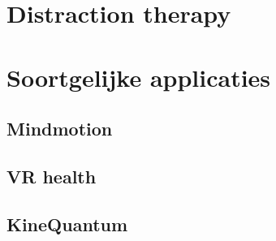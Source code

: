 \section{Distraction therapy}

\section{Soortgelijke applicaties}
\subsection{Mindmotion}
\subsection{VR health}
\subsection{KineQuantum}

